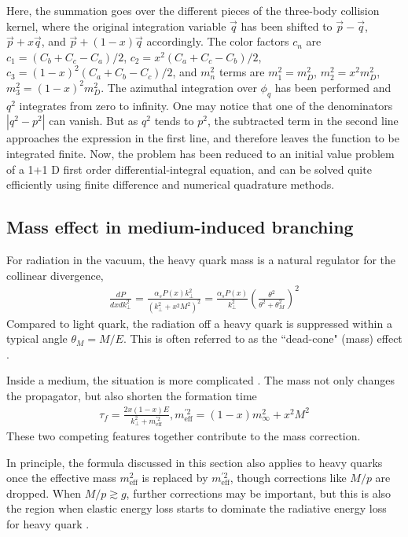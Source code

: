 Here, the summation goes over the different pieces of the three-body collision kernel, where the original integration variable $\vec{q}$ has been shifted to $\vec{p}-\vec{q}$, $\vec{p}+x\vec{q}$, and $\vec{p}+(1-x) \vec{q}$ accordingly.
The color factors $c_n$ are $c_1 = (C_b+C_c-C_a)/2$, $c_2 = x^2(C_a+C_c-C_b)/2$, $c_3 = (1-x)^2(C_a+C_b-C_c)/2$, and $m_n^2$ terms are $m_1^2 = m_D^2$, $m_2^2 = x^2 m_D^2$, $m_3^2 = (1-x)^2 m_D^2$.
The azimuthal integration over $\phi_q$ has been performed and $q^2$  integrates from zero to infinity.
One may notice that one of the denominators $|q^2-p^2|$ can vanish.
But as $q^2$ tends to $p^2$, the subtracted term in the second line approaches the expression in the first line, and therefore leaves the function to be integrated finite.
Now, the problem has been reduced to an initial value problem of a 1+1 D first order differential-integral equation, and can be solved quite efficiently using finite difference and numerical quadrature methods.

\subsection{Mass effect in medium-induced branching}
For radiation in the vacuum, the heavy quark mass is a natural regulator for the collinear divergence,
\begin{eqnarray}
\frac{dP}{dx dk_\perp^2} = \frac{\alpha_s P(x) k_\perp^2}{(k_\perp^2 + x^2 M^2)^2} = \frac{\alpha_s P(x)}{k_\perp^2}\left(\frac{\theta^2}{\theta^2 + \theta_M^2}\right)^2
\end{eqnarray}
Compared to light quark, the radiation off a heavy quark is suppressed within a typical angle $\theta_M = M/E$.
This is often referred to as the ``dead-cone" (mass) effect \cite{Dokshitzer_1991}.

Inside a medium, the situation is more complicated \cite{Dokshitzer:2001zm,Armesto:2003jh,Abir:2012pu,Zhang:2003wk}. 
The mass not only changes the propagator, but also shorten the formation time
\begin{eqnarray}
\tau_f = \frac{2x(1-x)E}{k_\perp^2 + m_{\textrm{eff}}^{'2}}, m_{\textrm{eff}}^{'2} = (1-x)m_\infty^2 + x^2 M^2
\end{eqnarray}
These two competing features together contribute to the mass correction.

In principle, the formula discussed in this section also applies to heavy quarks once the effective mass $m_{\textrm{eff}}^2$ is replaced by $m_{\textrm{eff}}^{'2}$, though corrections like $M/p$ are dropped.
When $M/p \gtrsim g$, further corrections may be important, but this is also the region when elastic energy loss starts to dominate the radiative energy loss for heavy quark \cite{Moore:2004tg}.

